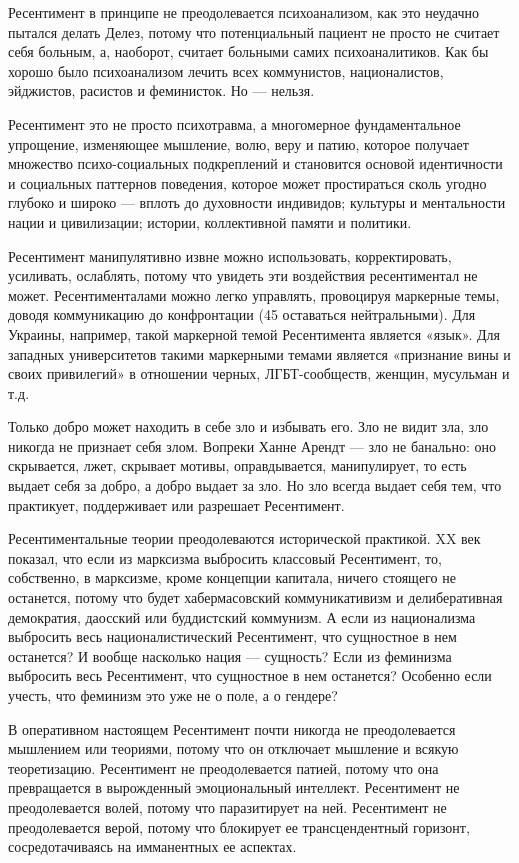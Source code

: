 Ресентимент в принципе не преодолевается психоанализом, как это неудачно
пытался делать Делез, потому что потенциальный пациент не просто не считает
себя больным, а, наоборот, считает больными самих психоаналитиков. Как бы
хорошо было психоанализом лечить всех коммунистов, националистов, эйджистов,
расистов и феминисток. Но — нельзя.

Ресентимент это не просто психотравма, а многомерное фундаментальное упрощение,
изменяющее мышление, волю, веру и патию, которое получает множество
психо-социальных подкреплений и становится основой идентичности и социальных
паттернов поведения, которое может простираться сколь угодно глубоко и широко —
вплоть до духовности индивидов; культуры и ментальности нации и цивилизации;
истории, коллективной памяти и политики.

Ресентимент манипулятивно извне можно использовать, корректировать, усиливать,
ослаблять, потому что увидеть эти воздействия ресентиментал не может.
Ресентименталами можно легко управлять, провоцируя маркерные темы, доводя
коммуникацию до конфронтации (45%
оставаться нейтральными). Для Украины, например, такой маркерной темой
Ресентимента является «язык». Для западных университетов такими маркерными
темами является «признание вины и своих привилегий» в отношении черных,
ЛГБТ-сообществ, женщин, мусульман и т.д.

Только добро может находить в себе зло и избывать его. Зло не видит зла, зло
никогда не признает себя злом. Вопреки Ханне Арендт — зло не банально: оно
скрывается, лжет, скрывает мотивы, оправдывается, манипулирует, то есть выдает
себя за добро, а добро выдает за зло. Но зло всегда выдает себя тем, что
практикует, поддерживает или разрешает Ресентимент.

Ресентиментальные теории преодолеваются исторической практикой. XX век показал,
что если из марксизма выбросить классовый Ресентимент, то, собственно, в
марксизме, кроме концепции капитала, ничего стоящего не останется, потому что
будет хабермасовский коммуникативизм и делиберативная демократия, даосский или
буддистский коммунизм. А если из национализма выбросить весь националистический
Ресентимент, что сущностное в нем останется? И вообще насколько нация —
сущность? Если из феминизма выбросить весь Ресентимент, что сущностное в нем
останется? Особенно если учесть, что феминизм это уже не о поле, а о гендере?

В оперативном настоящем Ресентимент почти никогда не преодолевается мышлением
или теориями, потому что он отключает мышление и всякую теоретизацию.
Ресентимент не преодолевается патией, потому что она превращается в вырожденный
эмоциональный интеллект. Ресентимент не преодолевается волей, потому что
паразитирует на ней. Ресентимент не преодолевается верой, потому что блокирует
ее трансцендентный горизонт, сосредотачиваясь на имманентных ее аспектах.

